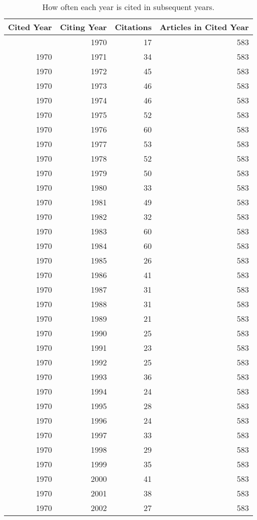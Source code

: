 \documentclass[
  10pt,
  letterpaper,
  DIV=11,
  numbers=noendperiod,
  twoside]{scrartcl}
\begin{document}
\begin{longtable}[]{@{}rrrr@{}}

\caption{\label{tbl-citation-count}How often each year is cited in
subsequent years.}

\tabularnewline

\toprule\noalign{}
Cited Year & Citing Year & Citations & Articles in Cited Year \\
\midrule\noalign{}
\endhead
\bottomrule\noalign{}
\endlastfoot
1970 & 1970 & 17 & 583 \\
1970 & 1971 & 34 & 583 \\
1970 & 1972 & 45 & 583 \\
1970 & 1973 & 46 & 583 \\
1970 & 1974 & 46 & 583 \\
1970 & 1975 & 52 & 583 \\
1970 & 1976 & 60 & 583 \\
1970 & 1977 & 53 & 583 \\
1970 & 1978 & 52 & 583 \\
1970 & 1979 & 50 & 583 \\
1970 & 1980 & 33 & 583 \\
1970 & 1981 & 49 & 583 \\
1970 & 1982 & 32 & 583 \\
1970 & 1983 & 60 & 583 \\
1970 & 1984 & 60 & 583 \\
1970 & 1985 & 26 & 583 \\
1970 & 1986 & 41 & 583 \\
1970 & 1987 & 31 & 583 \\
1970 & 1988 & 31 & 583 \\
1970 & 1989 & 21 & 583 \\
1970 & 1990 & 25 & 583 \\
1970 & 1991 & 23 & 583 \\
1970 & 1992 & 25 & 583 \\
1970 & 1993 & 36 & 583 \\
1970 & 1994 & 24 & 583 \\
1970 & 1995 & 28 & 583 \\
1970 & 1996 & 24 & 583 \\
1970 & 1997 & 33 & 583 \\
1970 & 1998 & 29 & 583 \\
1970 & 1999 & 35 & 583 \\
1970 & 2000 & 41 & 583 \\
1970 & 2001 & 38 & 583 \\
1970 & 2002 & 27 & 583 \\

\end{longtable}
\end{document}
